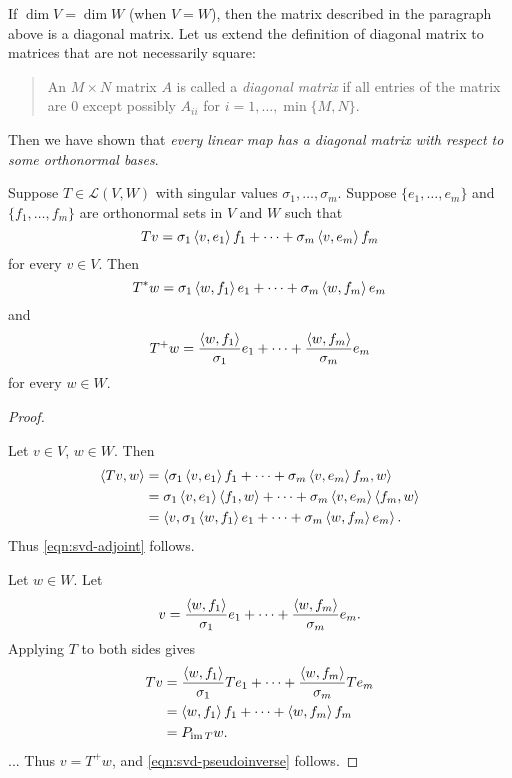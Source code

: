 If $\dim V=\dim W$ (when $V=W$), then the matrix described in the paragraph above is a diagonal matrix. 
Let us extend the definition of diagonal matrix to matrices that are not necessarily square:

\begin{quote}
An $M\times N$ matrix $A$ is called a \emph{diagonal matrix} if all entries of the matrix are $0$ except possibly $A_{ii}$ for $i=1,\dots,\min\{M,N\}$.
\end{quote}

Then we have shown that \emph{every linear map has a diagonal matrix with respect to some orthonormal bases}.

\begin{theorem}
Suppose $T\in\mathcal{L}(V,W)$ with singular values $\sigma_1,\dots,\sigma_m$. 
Suppose $\{e_1,\dots,e_m\}$ and $\{f_1,\dots,f_m\}$ are orthonormal sets in $V$ and $W$ such that
\[Tv=\sigma_1\left\langle v,e_1\right\rangle f_1+\cdots+\sigma_m\left\langle v,e_m\right\rangle f_m\]
for every $v\in V$. Then
\begin{equation}\label{eqn:svd-adjoint}
T^*w=\sigma_1\left\langle w,f_1\right\rangle e_1+\cdots+\sigma_m\left\langle w,f_m\right\rangle e_m
\end{equation}
and
\begin{equation}\label{eqn:svd-pseudoinverse}
T^+w=\frac{\left\langle w,f_1\right\rangle}{\sigma_1}e_1+\cdots+\frac{\left\langle w,f_m\right\rangle}{\sigma_m}e_m
\end{equation}
for every $w\in W$.
\end{theorem}

\begin{proof} \

 Let $v\in V$, $w\in W$. Then
\begin{align*}
\left\langle Tv,w\right\rangle
&=\left\langle\sigma_1\left\langle v,e_1\right\rangle f_1+\cdots+\sigma_m\left\langle v,e_m\right\rangle f_m,w\right\rangle\\
&=\sigma_1\left\langle v,e_1\right\rangle\left\langle f_1,w\right\rangle+\cdots+\sigma_m\left\langle v,e_m\right\rangle\left\langle f_m,w\right\rangle\\
&=\left\langle v,\sigma_1\left\langle w,f_1\right\rangle e_1+\cdots+\sigma_m\left\langle w,f_m\right\rangle e_m\right\rangle.
\end{align*}
Thus \eqref{eqn:svd-adjoint} follows.

 Let $w\in W$. Let
\[v=\frac{\left\langle w,f_1\right\rangle}{\sigma_1}e_1+\cdots+\frac{\left\langle w,f_m\right\rangle}{\sigma_m}e_m.\]
Applying $T$ to both sides gives
\begin{align*}
Tv&=\frac{\left\langle w,f_1\right\rangle}{\sigma_1}Te_1+\cdots+\frac{\left\langle w,f_m\right\rangle}{\sigma_m}Te_m\\
&=\left\langle w,f_1\right\rangle f_1+\cdots+\left\langle w,f_m\right\rangle f_m\\
&=P_{\operatorname{im} T}w.
\end{align*}
... Thus $v=T^+w$, and \eqref{eqn:svd-pseudoinverse} follows.
\end{proof}

